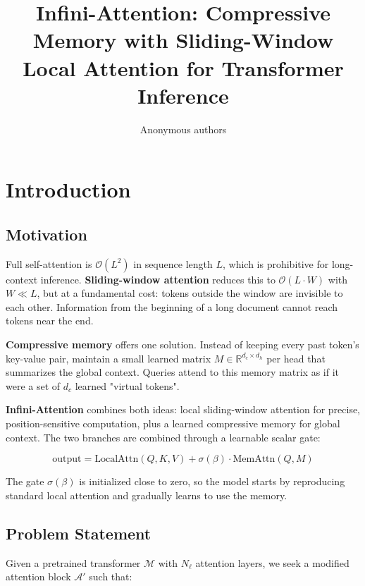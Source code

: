 \title{\textbf{Infini-Attention: Compressive Memory with Sliding-Window Local Attention for Transformer Inference}}

\author{Anonymous authors}



\section{Introduction}

\subsection{Motivation}

Full self-attention is $\mathcal{O}(L^2)$ in sequence length $L$, which is 
prohibitive for long-context inference. \textbf{Sliding-window attention} reduces 
this to $\mathcal{O}(L \cdot W)$ with $W \ll L$, but at a fundamental cost: 
tokens outside the window are invisible to each other. Information from the 
beginning of a long document cannot reach tokens near the end.

\textbf{Compressive memory} offers one solution. Instead of keeping every past 
token's key-value pair, maintain a small learned matrix $M \in \mathbb{R}^{d_c \times d_h}$ 
per head that summarizes the global context. Queries attend to this memory 
matrix as if it were a set of $d_c$ learned "virtual tokens".

\textbf{Infini-Attention} combines both ideas: local sliding-window attention for 
precise, position-sensitive computation, plus a learned compressive memory 
for global context. The two branches are combined through a learnable scalar 
gate:

\[
\text{output} = \text{LocalAttn}(Q, K, V) + \sigma(\beta) \cdot \text{MemAttn}(Q, M)
\tag{1.1}
\]

The gate $\sigma(\beta)$ is initialized close to zero, so the model starts by 
reproducing standard local attention and gradually learns to use the memory.

\subsection{Problem Statement}

Given a pretrained transformer $\mathcal{M}$ with $N_\ell$ attention layers, 
we seek a modified attention block $\mathcal{A}'$ such that:

